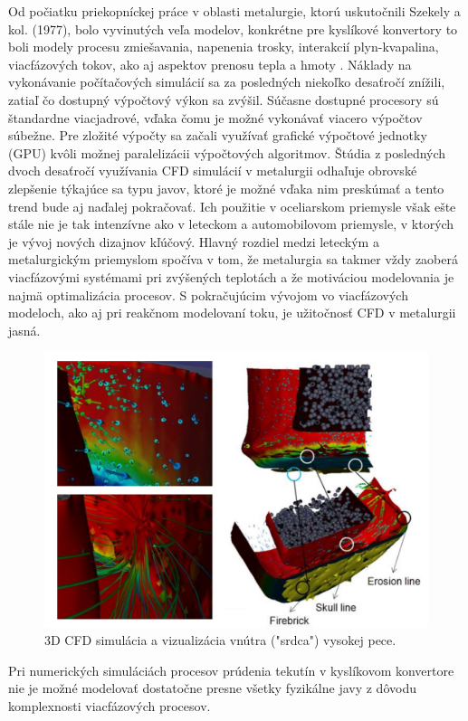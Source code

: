 \documentclass[]{tukediphc}
\begin{document}
Od počiatku priekopníckej práce v oblasti metalurgie, ktorú uskutočnili Szekely a kol. (1977), bolo vyvinutých veľa modelov, konkrétne pre kyslíkové konvertory to boli modely procesu zmiešavania, napenenia trosky, interakcií plyn-kvapalina, viacfázových tokov, ako aj aspektov prenosu tepla a hmoty \citep{chattopadhyay2010}. Náklady na vykonávanie počítačových simulácií sa za posledných niekoľko desaťročí znížili, zatiaľ čo dostupný výpočtový výkon sa zvýšil. Súčasne dostupné procesory sú štandardne viacjadrové, vďaka čomu je možné vykonávať viacero výpočtov súbežne. Pre zložité výpočty sa začali využívať grafické výpočtové jednotky (GPU) kvôli možnej paralelizácii výpočtových algoritmov. Štúdia z posledných dvoch desaťročí \citep{Ersson2018} využívania CFD simulácií v metalurgii odhaľuje obrovské zlepšenie týkajúce sa typu javov, ktoré je možné vďaka  nim preskúmať a tento trend bude  aj naďalej pokračovať. Ich použitie v oceliarskom priemysle však ešte stále nie je tak intenzívne ako v leteckom a automobilovom priemysle, v ktorých je vývoj nových dizajnov kľúčový. Hlavný rozdiel medzi leteckým a metalurgickým priemyslom spočíva v tom, že metalurgia sa takmer vždy zaoberá viacfázovými systémami pri zvýšených teplotách a že motiváciou modelovania je najmä optimalizácia procesov. S pokračujúcim vývojom vo viacfázových modeloch, ako aj pri reakčnom modelovaní toku, je užitočnosť CFD v metalurgii jasná.

\begin{figure}[!ht]
	\centering
	\includegraphics[width=.8\textwidth,angle=0]{figures/blast-furnace-erosion-vr.jpg}
	\caption{3D CFD simulácia a vizualizácia vnútra ("srdca") vysokej pece.}
\end{figure}

Pri numerických simuláciách procesov prúdenia tekutín v kyslíkovom konvertore nie je možné modelovať dostatočne presne všetky fyzikálne javy z dôvodu komplexnosti viacfázových procesov. 
\end{document}
